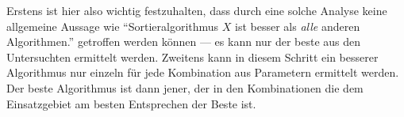 Erstens ist hier also wichtig festzuhalten, dass durch eine solche Analyse keine allgemeine Aussage wie \enquote{Sortieralgorithmus $X$ ist besser als \emph{alle} anderen Algorithmen.} getroffen werden können --- es kann nur der beste aus den Untersuchten ermittelt werden. Zweitens kann in diesem Schritt ein besserer Algorithmus nur einzeln für jede Kombination aus Parametern ermittelt werden. Der beste Algorithmus ist dann jener, der in den Kombinationen die dem Einsatzgebiet am besten Entsprechen der Beste ist.






